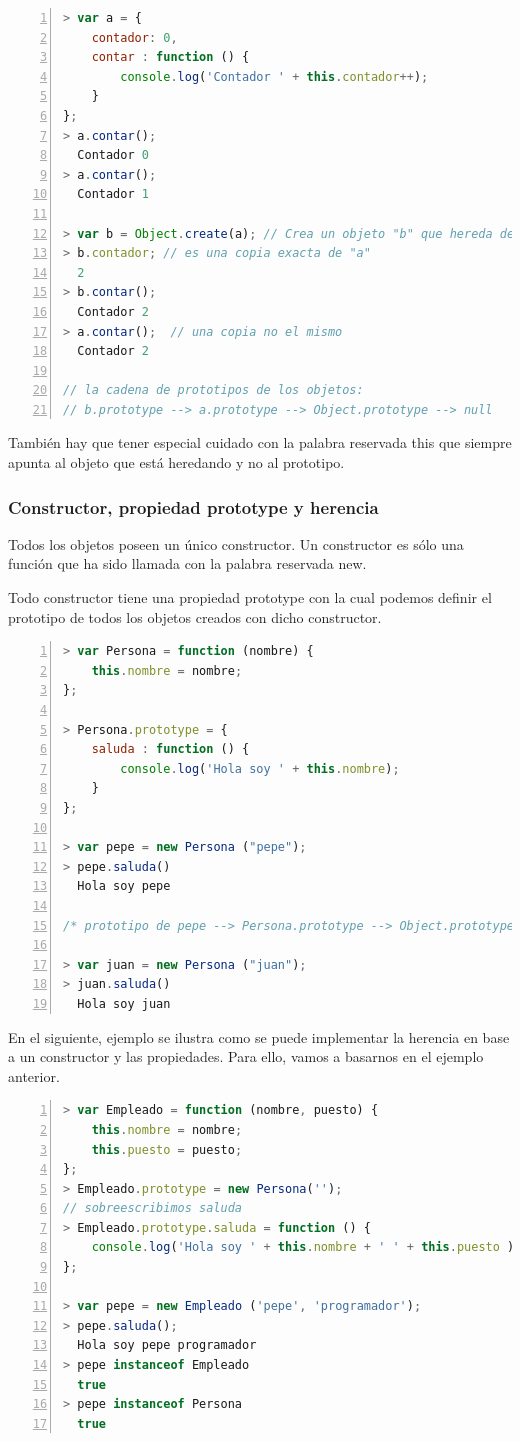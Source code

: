 \begin{lstlisting}[language=JavaScript, numbers=left]
> var a = { 
	contador: 0, 
	contar : function () { 
		console.log('Contador ' + this.contador++); 
	} 
};
> a.contar();
  Contador 0
> a.contar();
  Contador 1

> var b = Object.create(a); // Crea un objeto "b" que hereda de "a"
> b.contador; // es una copia exacta de "a"
  2
> b.contar();
  Contador 2
> a.contar();  // una copia no el mismo
  Contador 2

// la cadena de prototipos de los objetos:
// b.prototype --> a.prototype --> Object.prototype --> null
\end{lstlisting}

También hay que tener especial cuidado con la palabra reservada this que siempre apunta al objeto que está heredando y no al prototipo. 

\subsubsection{Constructor, propiedad prototype y herencia}
Todos los objetos poseen un único constructor. Un constructor es sólo una función que ha sido llamada con la palabra reservada new.

Todo constructor tiene una propiedad prototype con la cual podemos definir el prototipo de todos los objetos creados con dicho constructor.

\begin{lstlisting}[language=JavaScript, numbers=left]
> var Persona = function (nombre) { 
	this.nombre = nombre;
};

> Persona.prototype = {
	saluda : function () {
		console.log('Hola soy ' + this.nombre);
	}
};

> var pepe = new Persona ("pepe");
> pepe.saluda()
  Hola soy pepe

/* prototipo de pepe --> Persona.prototype --> Object.prototype --> null */

> var juan = new Persona ("juan");
> juan.saluda()
  Hola soy juan

\end{lstlisting}

En el siguiente, ejemplo se ilustra como se puede implementar la herencia en base a un constructor y las propiedades. Para ello, vamos a basarnos en el ejemplo anterior.

\begin{lstlisting}[language=JavaScript, numbers=left]
> var Empleado = function (nombre, puesto) { 
	this.nombre = nombre;
	this.puesto = puesto;
};
> Empleado.prototype = new Persona('');
// sobreescribimos saluda
> Empleado.prototype.saluda = function () { 
	console.log('Hola soy ' + this.nombre + ' ' + this.puesto );
};

> var pepe = new Empleado ('pepe', 'programador');
> pepe.saluda();
  Hola soy pepe programador
> pepe instanceof Empleado
  true
> pepe instanceof Persona
  true
\end{lstlisting}

